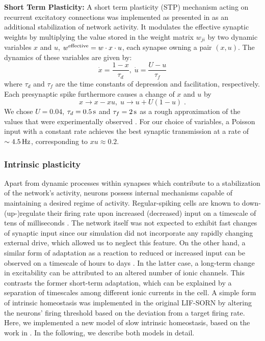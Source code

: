 \documentclass[10pt,letterpaper]{article}
\begin{document}
\textbf{Short Term Plasticity:} A short term plasticity (STP) mechanism acting on recurrent excitatory connections was implemented as presented in \cite{Markram_STP} as an additional stabilization of network activity. It modulates the effective synaptic weights by multiplying the value stored in the weight matrix $w_{ji}$ by two dynamic variables $x$ and $u$, $w^{\rm effective} = w\cdot x \cdot u$, each synapse owning a pair $(x,u)$. The dynamics of these variables are given by:
\begin{equation}
\dot{x} = \frac{1-x}{\tau_d},\; \dot{u} = \frac{U-u}{\tau_f}
\label{STP_dynamics1}
\end{equation}
where $\tau_d$ and $\tau_f$ are the time constants of depression and facilitation, respectively.
Each presynaptic spike furthermore causes a change of $x$ and $u$ by
\begin{equation}
x \rightarrow x - x u,\; u \rightarrow u + U(1-u) \; .
\label{STP_dynamics2}
\end{equation}
We chose $U=0.04$, $\tau_d =\rm 0.5\, s$ and $\tau_f =\rm 2\, s$ as a rough approximation of the values that were experimentally observed \cite{Markram_STP}. For our choice of variables, a Poisson input with a constant rate achieves the best synaptic transmission at a rate of $\sim \rm 4.5\, Hz$, corresponding to $x u \approx 0.2$.   

\subsubsection*{Intrinsic plasticity}
Apart from dynamic processes within synapses which contribute to a stabilization of the network's activity, neurons possess internal mechanisms capable of maintaining a desired regime of activity. Regular-spiking cells are known to down-(up-)regulate their firing rate upon increased (decreased) input on a timescale of tens of milliseconds \cite{Connors_Gutnick_Spike_Patterns,Benda_Herz_Spike_Frequ_Adaption}. The network itself was not expected to exhibit fast changes of synaptic input since our simulation did not incorporate any rapidly changing external drive, which allowed us to neglect this feature. On the other hand, a similar form of adaptation as a reaction to reduced or increased input can be observed on a timescale of hours to days \cite{Desai_IP}. In the latter case, a long-term change in excitability can be attributed to an altered number of ionic channels. This contrasts the former short-term adaptation, which can be explained by a separation of timescales among different ionic currents in the cell. A simple form of intrinsic homeostasis was implemented in the original LIF-SORN by altering the neurons' firing threshold based on the deviation from a target firing rate. Here, we implemented a new model of slow intrinsic homeostasis, based on the work in \cite{Sweeney_Paper}. In the following, we describe both models in detail.
\end{document}
